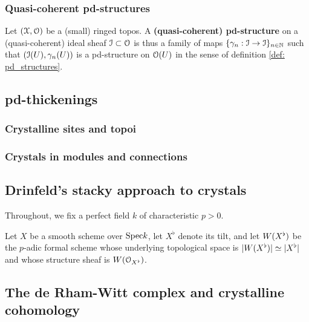         \subsubsection{Quasi-coherent pd-structures}
            \begin{definition} \label{def: quasi_coherent_pd_structures}
                Let $(\mathcal{X}, \mathcal{O})$ be a (small) ringed topos. A \textbf{(quasi-coherent) pd-structure} on a (quasi-coherent) ideal sheaf $\mathcal{I} \subset \mathcal{O}$ is thus a family of maps $\{\gamma_n: \mathcal{I} \to \mathcal{I}\}_{n \in \mathbb{N}}$ such that $(\mathcal{I}(U), \gamma_n(U))$ is a pd-structure on $\mathcal{O}(U)$ in the sense of definition \ref{def: pd_structures}. 
            \end{definition}
                
    \subsection{pd-thickenings}
        \subsubsection{Crystalline sites and topoi}
        
        \subsubsection{Crystals in modules and connections}
            
    \subsection{Drinfeld's stacky approach to crystals}
        \begin{convention}
            Throughout, we fix a perfect field $k$ of characteristic $p > 0$.
        \end{convention}
        
        Let $X$ be a smooth scheme over $\mathrm{Spec} k$, let $X^{\flat}$ denote its tilt, and let $W(X^{\flat})$ be the $p$-adic formal scheme whose underlying topological space is $|W(X^{\flat})| \simeq |X^{\flat}|$ and whose structure sheaf is $W(\mathcal{O}_{X^{\flat}})$. 
    
    \subsection{The de Rham-Witt complex and crystalline cohomology}
    
